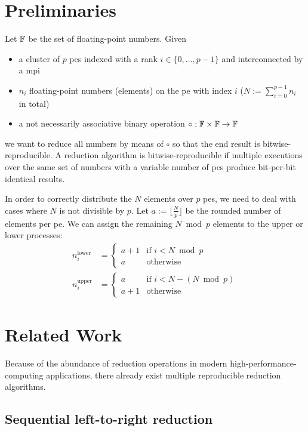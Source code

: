 \section{Preliminaries}
\label{sec:Preliminaries}
Let $\mathbb{F}$ be the set of floating-point numbers. Given
\begin{itemize}
\item a cluster of $p$ \glspl{pe} indexed with a rank $i \in \{0, \ldots, p - 1\}$ and interconnected by a \gls{mpi}
\item $n_i$ floating-point numbers (elements) on the \gls{pe} with index $i$ ($N := \sum_{i=0}^{p-1} n_i$ in total)
\item a not necessarily associative binary operation $\circ: \mathbb{F} \times \mathbb{F} \rightarrow \mathbb{F}$
\end{itemize}
we want to reduce all numbers by means of $\circ$ so that the end result is bitwise-reproducible.
A reduction algorithm is bitwise-reproducible if multiple executions over the same set of numbers with a variable number of \glspl{pe} produce bit-per-bit identical results.

In order to correctly distribute the $N$ elements over $p$ \glspl{pe}, we need to deal with cases where $N$ is not divisible by $p$.
Let $a := \lfloor \tfrac{N}{p} \rfloor$ be the rounded number of elements per \gls{pe}.
We can assign the remaining $N \bmod p$ elements to the upper or lower processes:
\begin{align}
\label{eq:lowerDistribution}
n_i^{\textrm{lower}} &= \begin{cases}
    a + 1 & \textrm{if } i < N \bmod p \\
    a & \textrm{otherwise}
\end{cases} \\
\label{eq:upperDistribution}
n_i^{\textrm{upper}} &= \begin{cases}
    a & \textrm{if } i < N - (N \bmod p) \\
    a + 1 & \textrm{otherwise}
\end{cases}
\end{align}

\section{Related Work}
\label{sec:RelatedWork}
Because of the abundance of reduction operations in modern high-performance-computing applications, there already exist multiple reproducible reduction algorithms.


\subsection{Sequential left-to-right reduction}
\label{sec:SequentialLeftToRightReduction}

